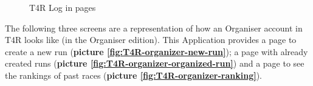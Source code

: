 \begin{figure}[H]
  \centering
  \caption{T4R Log in pages}
  \label{fig:T4R-login}
\end{figure}

The following three screens are a representation of how an Organiser account in T4R looks like (in the Organiser edition). This Application provides a page to create a new run (\textbf{picture \ref{fig:T4R-organizer-new-run}}); a page with already created runs (\textbf{picture \ref{fig:T4R-organizer-organized-run}}) and a page to see the rankings of past races (\textbf{picture \ref{fig:T4R-organizer-ranking}}).

